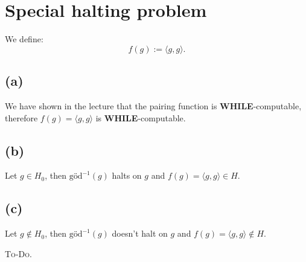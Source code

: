 

\setcounter{section}{2}


\section{Special halting problem}

We define:
\[
f(g) := \langle g, g \rangle.
\]

\subsection*{(a)}
We have shown in the lecture that the pairing function is \textbf{WHILE}-computable, therefore $f(g) = \langle g, g \rangle$ is \textbf{WHILE}-computable.

\subsection*{(b)}
Let $g \in H_0$, then $\text{göd}^{-1}(g)$ halts on $g$ and $f(g) = \langle g, g \rangle \in H$.

\subsection*{(c)}
Let $g \notin H_0$, then $\text{göd}^{-1}(g)$ doesn’t halt on $g$ and $f(g) = \langle g, g \rangle \notin H$.




\textsc{To-Do.}



